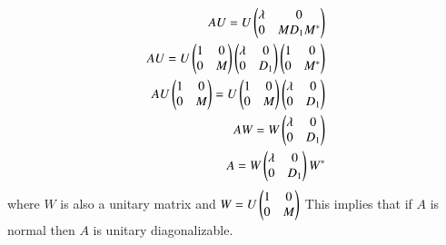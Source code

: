 \documentclass[journal,12pt,twocolumn]{IEEEtran}
\renewcommand\thesection{\arabic{section}}
\begin{document}
\begin{align}
AU = U \begin{pmatrix}\lambda & 0\\0 & M D_1 M^*\end{pmatrix}\\
AU = U \begin{pmatrix}1 & 0\\0 & M\end{pmatrix}\begin{pmatrix}\lambda & 0\\0 & D_1\end{pmatrix}\begin{pmatrix}1 & 0\\0 & M^*\end{pmatrix}\\
AU\begin{pmatrix}1 & 0\\0 & M\end{pmatrix} = U \begin{pmatrix}1 & 0\\0 & M\end{pmatrix}\begin{pmatrix}\lambda & 0\\0 & D_1\end{pmatrix}\\
AW = W\begin{pmatrix}\lambda & 0\\0 & D_1\end{pmatrix}\\
A = W\begin{pmatrix}\lambda & 0\\0 & D_1\end{pmatrix}W^*
\end{align}
where $W$ is also a unitary matrix and $W=U\begin{pmatrix}1 & 0\\0 & M\end{pmatrix}$
This implies that if $A$ is normal then $A$ is unitary diagonalizable.

%
\end{document}
